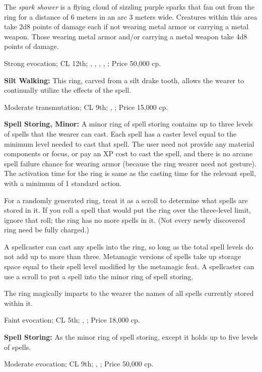 The \emph{spark shower} is a flying cloud of sizzling purple sparks that fan out from the ring for a distance of 6 meters in an arc 3 meters wide. Creatures within this area take 2d8 points of damage each if not wearing metal armor or carrying a metal weapon. Those wearing metal armor and/or carrying a metal weapon take 4d8 points of damage.

Strong evocation; CL 12th; , , , , ; Price 50,000 cp.


\textbf{Silt Walking:} This ring, carved from a silt drake tooth, allows the wearer to continually utilize the effects of the  spell.

Moderate transmutation; CL 9th; , ; Price 15,000 cp.


\textbf{Spell Storing, Minor:} A minor ring of spell storing contains up to three levels of spells that the wearer can cast. Each spell has a caster level equal to the minimum level needed to cast that spell. The user need not provide any material components or focus, or pay an XP cost to cast the spell, and there is no arcane spell failure chance for wearing armor (because the ring wearer need not gesture). The activation time for the ring is same as the casting time for the relevant spell, with a minimum of 1 standard action.

For a randomly generated ring, treat it as a scroll to determine what spells are stored in it. If you roll a spell that would put the ring over the three-level limit, ignore that roll; the ring has no more spells in it. (Not every newly discovered ring need be fully charged.)

A spellcaster can cast any spells into the ring, so long as the total spell levels do not add up to more than three. Metamagic versions of spells take up storage space equal to their spell level modified by the metamagic feat. A spellcaster can use a scroll to put a spell into the minor ring of spell storing.

The ring magically imparts to the wearer the names of all spells currently stored within it.

Faint evocation; CL 5th; , ; Price 18,000 cp.


\textbf{Spell Storing:} As the minor ring of spell storing, except it holds up to five levels of spells.

Moderate evocation; CL 9th; , ; Price 50,000 cp.


